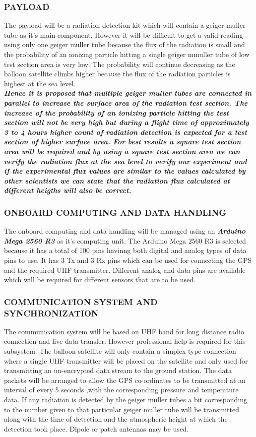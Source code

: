 \documentclass[9pt]{IEEEtran}
\begin{document}
\subsubsection{PAYLOAD}
	The payload will be a radiation detection kit which will contain a geiger muller tube as it's main component.
	However it will be difficult to get a valid reading using only one geiger muller tube because the flux of the radiation
	is small and the probability of an ionizing particle hitting a single geiger mmuller tube of low test section area is very low.
	The probability will continue decreasing as the balloon satellite climbs higher because the flux of the radiation particles
	is highest at the sea level.\\
	\emph{\textbf{Hence it is proposed that multiple geiger muller tubes are connected in parallel to increase the surface area of the
	radiation test section. The increase of the probability of an ionizing particle hitting the test section will not be very high
	but during a flight time of approximately 3 to 4 hours higher count of radiation detection is expected for a test section of
	higher surface area. For best results a square test section area will be required and by using a square test section area we can
	verify the radiation flux at the sea level to verify our experiment and if the experimental flux values are similar to the values
	calculated by other scientists we can state that the radiation flux calculated at different heigths will also be correct.}}
\\
\subsubsection{ONBOARD COMPUTING AND DATA HANDLING}
	The onboard computing and data handling will be managed using an \textbf{\emph{Arduino Mega 2560 R3}} as it's computing unit.
	The Arduino Mega 2560 R3 is selected because it has a total of 100 pins havinng both digital and analog types of  data pins to use.
	It has 3 Tx and 3 Rx pins which can be used for connecting the GPS and the required UHF transmitter.
	Different analog and data pins are available which will be required for different sensors that are to be used.
	\\
\subsubsection{COMMUNICATION SYSTEM AND SYNCHRONIZATION}
	The communication system will be based on UHF band for long distance radio connection and live data transfer.
	However professional help is required for this subsystem.
	The balloon satellite will only contain a simplex type connection where a single UHF transmitter will be placed on the
	satellite and only used for transmitting an un-encrypted data stream to the ground station.
	The data packets will be arranged to allow the GPS co-ordinates to be transmitted at an interval of every 5 seconds ,with the
	corresponding pressure and temperature data. If any radiation is detected by the geiger muller tubes a bit corresponding to the
	number given to that particular geiger muller tube will be transmitted along with the time of detection and the atmospheric height
	at which the detection took place.
	Dipole or patch antennas may be used.
\end{document}
